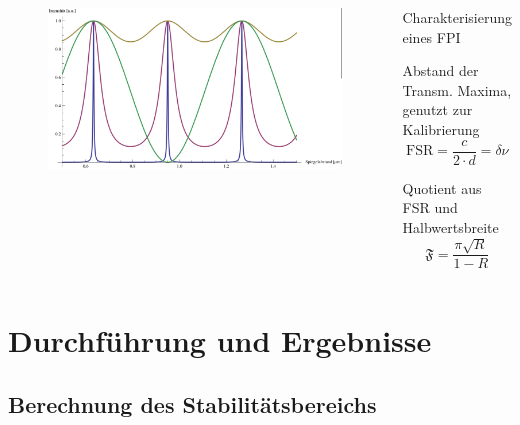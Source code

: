 \documentclass[10pt, aspectratio=169]{beamer}
\begin{document}
\begin{frame}
  \begin{columns}
    \begin{figure}
      \includegraphics[width=1\columnwidth]{fpitrans.png}
    \end{figure}
    \begin{block}{Charakterisierung eines FPI}
      \begin{description}
      \item<1->[Free Spectral Range (FSR)] Abstand der Transm. Maxima,
        genutzt zur Kalibrierung 
        \begin{equation}
          \label{eq:fsr}
          \text{FSR} = \frac{c}{2\cdot d} = \delta\nu
        \end{equation}
      \item<2->[Finesse] Quotient aus FSR und Halbwertsbreite
        \begin{equation}
          \label{eq:finesse}
          \mathfrak{F} = \frac{\pi\sqrt{R}}{1-R}
        \end{equation}
      \end{description}
    \end{block}
  \end{columns}
\end{frame}

\section{Durchf\"uhrung und Ergebnisse}
\label{sec:durchf}

\subsection{Berechnung des Stabilit\"atsbereichs}
\label{sec:stab}
\end{document}
